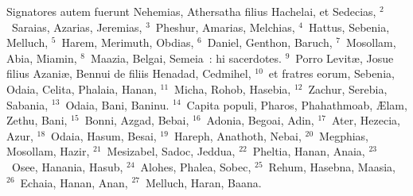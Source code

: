 \lettrine[lines=10,image=true,loversize=0.05,lraise=-0.03]{S}{}ignatores autem fuerunt Nehemias, Athersatha filius Hachelai, et Sedecias,
${}^{2}$~Saraias, Azarias, Jeremias,
${}^{3}$~Pheshur, Amarias, Melchias,
${}^{4}$~Hattus, Sebenia, Melluch,
${}^{5}$~Harem, Merimuth, Obdias,
${}^{6}$~Daniel, Genthon, Baruch,
${}^{7}$~Mosollam, Abia, Miamin,
${}^{8}$~Maazia, Belgai, Semeia~: hi sacerdotes.
${}^{9}$~Porro Levit\ae , Josue filius Azani\ae , Bennui de filiis Henadad, Cedmihel,
${}^{10}$~et fratres eorum, Sebenia, Odaia, Celita, Phalaia, Hanan,
${}^{11}$~Micha, Rohob, Hasebia,
${}^{12}$~Zachur, Serebia, Sabania,
${}^{13}$~Odaia, Bani, Baninu.
${}^{14}$~Capita populi, Pharos, Phahathmoab, \AE lam, Zethu, Bani,
${}^{15}$~Bonni, Azgad, Bebai,
${}^{16}$~Adonia, Begoai, Adin,
${}^{17}$~Ater, Hezecia, Azur,
${}^{18}$~Odaia, Hasum, Besai,
${}^{19}$~Hareph, Anathoth, Nebai,
${}^{20}$~Megphias, Mosollam, Hazir,
${}^{21}$~Mesizabel, Sadoc, Jeddua,
${}^{22}$~Pheltia, Hanan, Anaia,
${}^{23}$~Osee, Hanania, Hasub,
${}^{24}$~Alohes, Phalea, Sobec,
${}^{25}$~Rehum, Hasebna, Maasia,
${}^{26}$~Echaia, Hanan, Anan,
${}^{27}$~Melluch, Haran, Baana.


